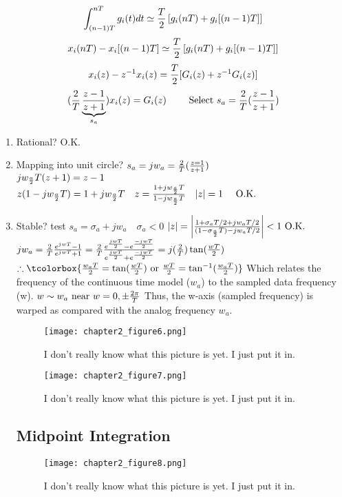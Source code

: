 \documentclass[11pt,fleqn]{book} %
\begin{document}
$$\int_{(n-1)T}^{nT}g_i(t)dt\simeq{T\over 2}\left[g_i(nT)+g_i[(n-1)T]\right]$$
$$x_i(nT)-x_i[(n-1)T]\simeq{T\over 2}\left[g_i(nT)+g_i[(n-1)T]\right]$$
$$x_i(z)-z^{-1}x_i(z)={T\over 2}[G_i(z)+z^{-1}G_i(z)]$$
$$({2\over T}\underbrace{z-1\over z+1}_{s_a})x_i(z)=G_i(z)\qquad \text{ Select }s_a={2\over T}({z-1\over z+1})$$
\begin{enumerate}
 \item Rational? O.K.
 \item Mapping into unit circle? $s_a=jw_a={2\over T}({z=1\over z+1})$\\
$jw_{a\over 2}T(z+1)=z-1$\\
$z(1-jw_{a\over 2}T)=1+jw_{a\over 2}T\quad z={1+jw_{a\over 2}T\over 1-jw_{a\over 2}T} \quad |z|=1 \quad\text{ O.K.}$
\item Stable? test $s_a=\sigma_a+jw_a\quad\sigma_a<0$
$|z|=\left|{1+\sigma_aT/2+jw_aT/2\over(1-\sigma_{a\over 2}T)-jw_aT/2}\right|<1 \text{ O.K.}$
$jw_a={2\over T}{e^{jwT}-1\over e^{jwT}+1}={2\over T}{e^{jwT\over 2}-e^{-jwT\over 2}\over e^{jwT\over 2}+e^{-jwT\over 2}}=j({2\over T})\tan({wT\over 2})$
$\therefore\tcolorbox{{w_aT\over 2}=\tan({wT\over 2})\text{ or }{wT\over 2}=\tan^{-1}({w_aT\over 2})}$
Which relates the frequency of the continuous time model ($w_a$) to the sampled data frequency (w).
$w\sim w_a\text{ near }w=0,\pm{2\pi\over T}$
Thus, the w-axis (sampled frequency) is warped as compared with the analog frequency $w_a$.

\begin{figure}[h]
  \centering\texttt{[image: chapter2\_figure6.png]}
  \caption{I don't really know what this picture is yet. I just put it in.}
\end{figure}

\begin{figure}[h]
  \centering\texttt{[image: chapter2\_figure7.png]}
  \caption{I don't really know what this picture is yet. I just put it in.}
\end{figure}

\subsection{Midpoint Integration}

\begin{figure}[h]
  \centering\texttt{[image: chapter2\_figure8.png]}
  \caption{I don't really know what this picture is yet. I just put it in.}
\end{figure}


\end{enumerate}
\end{document}
